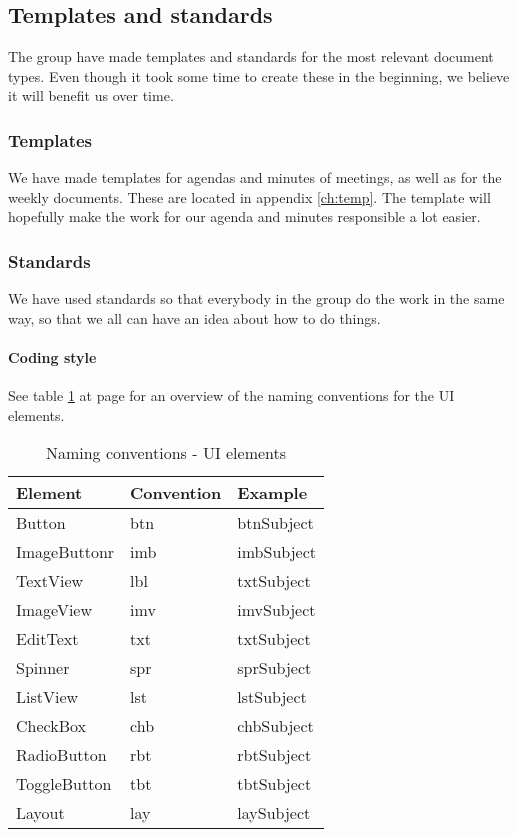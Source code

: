 \subsection{Templates and standards}
The group have made templates and standards for the most relevant document types. Even though it took some time to create these in the beginning, we believe it will benefit us over time.

\subsubsection{Templates}
We have made templates for agendas and minutes of meetings, as well as for the weekly documents. These are located in appendix \ref{ch:temp}. The template will hopefully make the work for our agenda and minutes responsible a lot easier.

\subsubsection{Standards}
We have used standards so that everybody in the group do the work in the same way, so that we all can have an idea about how to do things.

\paragraph{Coding style}\hfill
\newline
See table \ref{tab:namingconventions} at page \pageref{tab:namingconventions} for an overview of the naming conventions for the UI elements.
\begin{table}[htb]
\begin{center}
\begin{tabular}{l|l|l} \hline
\textbf{Element} & \textbf{Convention} & \textbf{Example} \\ \hline \hline
Button & btn & btnSubject \\
ImageButtonr & imb & imbSubject \\
TextView & lbl & txtSubject \\
ImageView & imv & imvSubject \\
EditText & txt & txtSubject \\
Spinner & spr & sprSubject \\
ListView & lst & lstSubject \\
CheckBox & chb & chbSubject \\
RadioButton & rbt & rbtSubject \\
ToggleButton & tbt & tbtSubject \\
Layout & lay & laySubject \\ \hline 
\end{tabular}
\end{center}
\caption{Naming conventions - UI elements}\label{tab:namingconventions}
\end{table}

